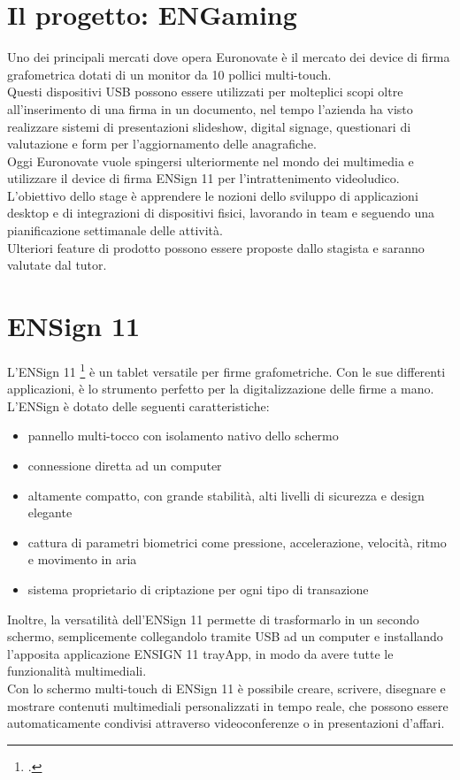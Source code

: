 \section{Il progetto: ENGaming}

Uno dei principali mercati dove opera Euronovate è il mercato dei device di firma grafometrica
dotati di un monitor da 10 pollici multi-touch.\\ Questi dispositivi USB possono essere utilizzati
per molteplici scopi oltre all'inserimento di una firma in un documento, nel tempo l'azienda ha visto
realizzare sistemi di presentazioni slideshow, digital signage, questionari di valutazione e form
per l'aggiornamento delle anagrafiche.\\ Oggi Euronovate vuole spingersi ulteriormente nel mondo dei
multimedia e utilizzare il device di firma ENSign 11 per l'intrattenimento videoludico.\\
L'obiettivo dello stage è apprendere le nozioni dello sviluppo di applicazioni desktop e di integrazioni di dispositivi fisici, lavorando in team e seguendo una pianificazione
settimanale delle attività.\\ 
Ulteriori feature di prodotto possono essere proposte dallo stagista e saranno valutate dal tutor.

\section{ENSign 11}

L'ENSign 11 \footcite{site:ensign11}  è un tablet versatile per firme grafometriche. Con le sue differenti applicazioni, è lo strumento perfetto per la digitalizzazione delle firme a mano.\\
L'ENSign è dotato delle seguenti caratteristiche:
\begin{itemize}
    \item pannello multi-tocco con isolamento nativo dello schermo
    \item connessione diretta ad un computer
    \item altamente compatto, con grande stabilità, alti livelli di sicurezza e design elegante
    \item cattura di parametri biometrici come pressione, accelerazione, velocità, ritmo e movimento in aria
    \item sistema proprietario di criptazione per ogni tipo di transazione
\end{itemize}
Inoltre, la versatilità dell'ENSign 11 permette di trasformarlo in un secondo schermo, semplicemente collegandolo tramite USB ad un computer e installando l'apposita applicazione ENSIGN 11 trayApp, in modo da avere tutte le funzionalità multimediali.\\
Con lo schermo multi-touch di ENSign 11 è possibile creare, scrivere, disegnare e mostrare contenuti multimediali personalizzati in tempo reale, che possono essere automaticamente condivisi attraverso videoconferenze o in presentazioni d'affari.

